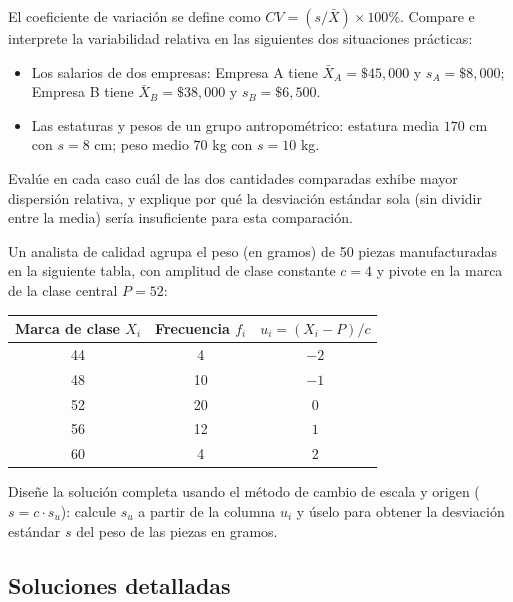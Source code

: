 \begin{problema}
	\label{prob:dd18a2e}
	El coeficiente de variación se define como $CV = (s/\bar{X}) \times 100\%$. Compare e interprete la variabilidad relativa en las siguientes dos situaciones prácticas:
	\begin{itemize}
		\item Los salarios de dos empresas: Empresa A tiene $\bar{X}_A = \$45,000$ y $s_A = \$8,000$; Empresa B tiene $\bar{X}_B = \$38,000$ y $s_B = \$6,500$.
		\item Las estaturas y pesos de un grupo antropométrico: estatura media $170$ cm con $s = 8$ cm; peso medio $70$ kg con $s = 10$ kg.
	\end{itemize}
	Evalúe en cada caso cuál de las dos cantidades comparadas exhibe mayor dispersión relativa, y explique por qué la desviación estándar sola (sin dividir entre la media) sería insuficiente para esta comparación.
\end{problema}

\begin{problema}
	\label{prob:78de91c}
	Un analista de calidad agrupa el peso (en gramos) de 50 piezas manufacturadas en la siguiente tabla, con amplitud de clase constante $c=4$ y pivote en la marca de la clase central $P=52$:
	\begin{center}
		\begin{tabular}{ccc}
			\hline
			Marca de clase $X_i$ & Frecuencia $f_i$ & $u_i=(X_i-P)/c$ \\
			\hline
			44 & 4  & $-2$ \\
			48 & 10 & $-1$ \\
			52 & 20 & $0$ \\
			56 & 12 & $1$ \\
			60 & 4  & $2$ \\
			\hline
		\end{tabular}
	\end{center}
	Diseñe la solución completa usando el método de cambio de escala y origen ($s = c \cdot s_u$): calcule $s_u$ a partir de la columna $u_i$ y úselo para obtener la desviación estándar $s$ del peso de las piezas en gramos.
\end{problema}

\subsection*{Soluciones detalladas}

